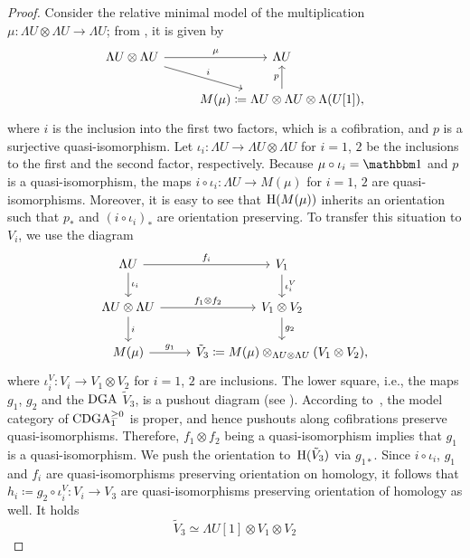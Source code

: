 \documentclass[\MainFolder/Text.tex]{subfiles}
\begin{document}
\begin{proof}
Consider the relative minimal model of the multiplication $\mu: \Lambda U \otimes \Lambda U \rightarrow \Lambda U$; from \cite[Example~2.48]{Felix2008}, it is given by
\begin{equation}\label{Eq:RelMinMod}
\begin{tikzcd}
\Lambda U \otimes \Lambda U\arrow{r}{\mu} \arrow{rd}{i} & \Lambda U \\
& M(\mu)\coloneqq \Lambda U \otimes \Lambda U \otimes \Lambda(U[1]), \arrow{u}{p}
\end{tikzcd}
\end{equation}
where $i$ is the inclusion into the first two factors, which is a cofibration, and $p$ is a surjective quasi-isomorphism. Let $\iota_i : \Lambda U \rightarrow \Lambda U \otimes \Lambda U$ for $i=1$, $2$ be the inclusions to the first and the second factor, respectively. Because $\mu \circ \iota_i = \Id$ and $p$ is a quasi-isomorphism, the maps $i \circ \iota_i : \Lambda U \rightarrow M(\mu)$ for $i=1$, $2$ are quasi-isomorphisms. Moreover, it is easy to see that $\mathrm{H}(M(\mu))$ inherits an orientation such that $p_*$ and $(i\circ \iota_i)_*$ are orientation preserving. To transfer this situation to $V_i$, we use the diagram
\begin{equation}\label{Eq:Pushout}
\begin{tikzcd}
\Lambda U \arrow{r}{f_i}\arrow{d}{\iota_i}& V_1 \arrow{d}{\iota_i^V} \\
\Lambda U \otimes \Lambda U \arrow{r}{f_1\otimes f_2} \arrow{d}{i} & V_1 \otimes V_2 \arrow{d}{g_2} \\
M(\mu) \arrow{r}{g_1} & \tilde{V}_3 \coloneqq  M(\mu) \otimes_{\Lambda U \otimes \Lambda U} (V_1\otimes V_2),
\end{tikzcd}
\end{equation}
where $\iota_i^V : V_i \rightarrow V_1 \otimes V_2$ for $i=1$, $2$ are inclusions. The lower square, i.e., the maps $g_1$, $g_2$ and the $\mathrm{DGA}$ $\tilde{V}_3$, is a pushout diagram (see \cite[Example~1.4]{LoopSpaces}). According to~\cite{MO204414}, the model category of $\mathrm{CDGA}_{1}^{\ge 0}$ is proper, and hence pushouts along cofibrations preserve quasi-isomorphisms. Therefore, $f_1\otimes f_2$ being a quasi-isomorphism implies that $g_1$ is a quasi-isomorphism. We push the orientation to~$\mathrm{H}(\tilde{V}_3)$ via $g_{1*}$. Since $i\circ \iota_i$, $g_1$ and $f_i$ are quasi-isomorphisms preserving orientation on homology, it follows that $h_i\coloneqq g_2\circ \iota_i^V:  V_i \rightarrow V_3$ are quasi-isomorphisms preserving orientation of homology as well. It holds
$$ \tilde{V}_3 \simeq \Lambda U[1] \otimes V_1 \otimes V_2 $$

\end{proof}
\end{document}
